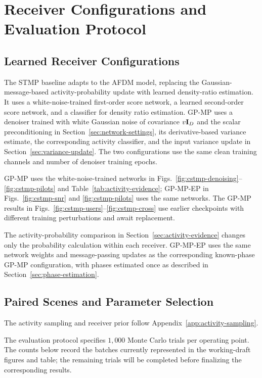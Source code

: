 \section{Receiver Configurations and Evaluation Protocol}
\label{app:evaluation-protocol}

\subsection{Learned Receiver Configurations}
\label{app:receiver-configurations}

The STMP baseline adapts \cite{cai2026} to the AFDM model, replacing
the Gaussian-message-based activity-probability update with learned
density-ratio estimation. It uses a white-noise-trained first-order score network, a
learned second-order score network, and a classifier for density ratio estimation.
GP-MP uses a denoiser trained with white Gaussian noise of covariance
$v\mathbf{I}_D$ and the scalar preconditioning
in Section~\ref{sec:network-settings}, its derivative-based variance
estimate, the corresponding activity classifier, and the input
variance update in Section~\ref{sec:variance-update}.
The two configurations use the same clean training channels and number of
denoiser training epochs.

GP-MP uses the white-noise-trained networks in
Figs.~\ref{fig:cstmp-denoising}--\ref{fig:cstmp-pilots}
and Table~\ref{tab:activity-evidence}; GP-MP-EP in
Figs.~\ref{fig:cstmp-snr} and \ref{fig:cstmp-pilots} uses the same networks.
The GP-MP results in Figs.~\ref{fig:cstmp-users}--\ref{fig:cstmp-cross} use earlier checkpoints
with different training perturbations and await replacement.

The activity-probability comparison in Section~\ref{sec:activity-evidence}
changes only the probability calculation within each receiver.
GP-MP-EP uses the same network weights and message-passing updates
as the corresponding known-phase GP-MP configuration, with phases
estimated once as described in Section~\ref{sec:phase-estimation}.

\subsection{Paired Scenes and Parameter Selection}
\label{app:paired-scenes}

The activity sampling and receiver prior follow
Appendix~\ref{app:activity-sampling}.

The evaluation protocol specifies $1{,}000$ Monte Carlo trials per
operating point. The counts below record the batches currently represented
in the working-draft figures and table; the remaining trials will be
completed before finalizing the corresponding results.

